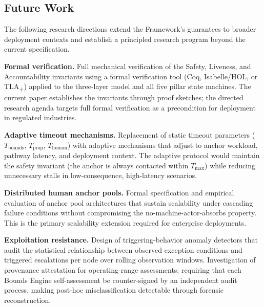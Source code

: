\subsection{Future Work}\label{sec:future-work}

The following research directions extend the \bxthree{} Framework's guarantees
to broader deployment contexts and establish a principled research program
beyond the current specification.

\textbf{Formal verification.}  Full mechanical verification of the Safety,
Liveness, and Accountability invariants using a formal verification tool
(Coq, Isabelle/HOL, or TLA\textsubscript{+}) applied to the \bxthree{} three-layer
model and all five pillar state machines.  The current paper establishes the
invariants through proof sketches; the directed research agenda targets full
formal verification as a precondition for deployment in regulated industries.

\textbf{Adaptive timeout mechanisms.}  Replacement of static timeout
parameters ($T_{\text{bounds}}$, $T_{\text{prop}}$, $T_{\text{human}}$) with
adaptive mechanisms that adjust to anchor workload, pathway latency, and
deployment context.  The adaptive protocol would maintain the safety invariant
(the anchor is always contacted within $T_{\max}$) while reducing unnecessary
stalls in low-consequence, high-latency scenarios.

\textbf{Distributed human anchor pools.}  Formal specification and empirical
evaluation of anchor pool architectures that sustain scalability under
cascading failure conditions without compromising the no-machine-actor-absorbs
property.  This is the primary scalability extension required for enterprise
\bxthree{} deployments.

\textbf{Exploitation resistance.}  Design of triggering-behavior anomaly
detectors that audit the statistical relationship between observed exception
conditions and triggered escalations per node over rolling observation windows.
Investigation of provenance attestation for operating-range assessments:
requiring that each Bounds Engine self-assessment be counter-signed by an
independent audit process, making post-hoc misclassification detectable through
forensic reconstruction.